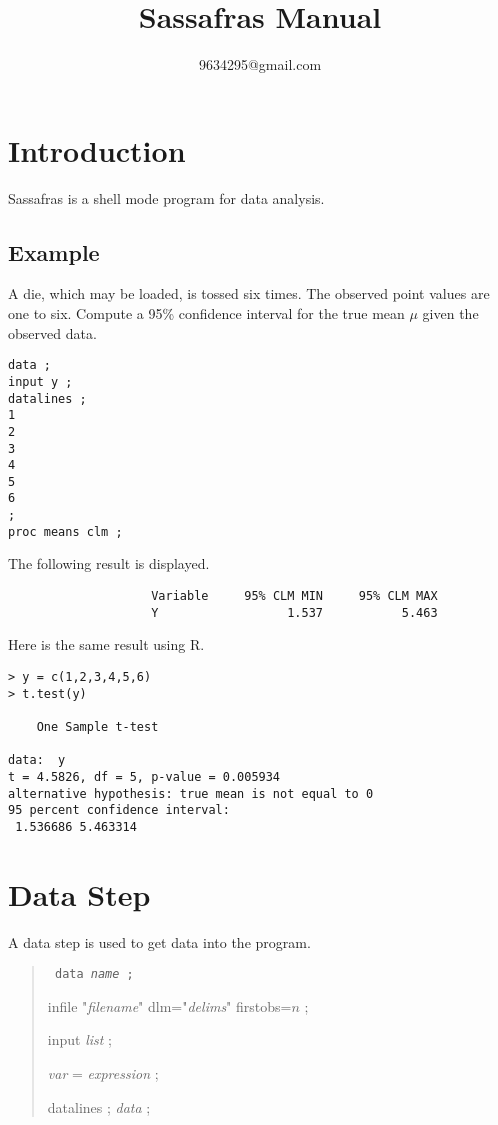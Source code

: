 \documentclass[12pt]{article}
\title{Sassafras Manual}
\author{9634295@gmail.com}
\begin{document}
\maketitle
\newpage
\tableofcontents
\newpage

\section{Introduction}

Sassafras is a shell mode program for data analysis.

\subsection*{Example}

A die, which may be loaded, is tossed six times.
The observed point values are one to six.
Compute a 95\% confidence interval for the true mean $\mu$
given the observed data.

{\scriptsize\begin{verbatim}
data ;
input y ;
datalines ;
1
2
3
4
5
6
;
proc means clm ;
\end{verbatim}}

The following result is displayed.

{\scriptsize\begin{verbatim}
                    Variable     95% CLM MIN     95% CLM MAX
                    Y                  1.537           5.463
\end{verbatim}}

Here is the same result using R.

{\scriptsize\begin{verbatim}
> y = c(1,2,3,4,5,6)
> t.test(y)

	One Sample t-test

data:  y
t = 4.5826, df = 5, p-value = 0.005934
alternative hypothesis: true mean is not equal to 0
95 percent confidence interval:
 1.536686 5.463314
\end{verbatim}}

\newpage

\section{Data Step}
A data step is used to get data into the program.

\begin{quote}
{\tt
data {\it name} ;

infile "{\it filename}" dlm="{\it delims}" firstobs=$n$ ;

input {\it list} ;

{\it var} = {\it expression} ;

datalines ; {\it data} ;
}
\end{quote}
\end{document}

